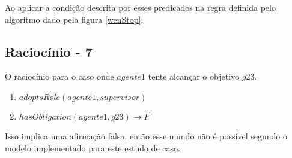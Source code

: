 Ao aplicar a condição descrita por esses predicados na regra definida pelo algoritmo dado pela figura \ref{wenStop}.

\subsection{Raciocínio - 7}
\label{raciocinio7}
O raciocínio para o caso onde $agente1$ tente alcançar o objetivo $g23$.  

\begin{enumerate}
	\item $adoptsRole(agente1,supervisor)$
	\item $hasObligation(agente1,g23) \to F$										
\end{enumerate}

Isso implica uma afirmação falsa, então esse mundo não é possível segundo o modelo implementado para este estudo de caso.